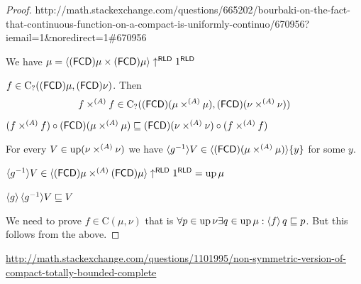 \begin{proof}

http://math.stackexchange.com/questions/665202/bourbaki-on-the-fact-that-continuous-function-on-a-compact-is-uniformly-continuo/670956?iemail=1\&noredirect=1\#670956

We have $\mu= \langle (\mathsf{FCD}) \mu \times
(\mathsf{FCD}) \mu \rangle \uparrow^{\mathsf{RLD}} 1^{\mathsf{RLD}}$

$f \in \mathrm{C}_? ((\mathsf{FCD}) \mu, (\mathsf{FCD})
\nu)$. Then
\[ f \times^{(A)} f \in \mathrm{C}_? ((\mathsf{FCD}) (\mu \times^{(A)}
   \mu) , (\mathsf{FCD}) (\nu \times^{(A)} \nu)) \]
$(f \times^{(A)} f) \circ (\mathsf{FCD}) (\mu \times^{(A)} \mu)
\sqsubseteq (\mathsf{FCD}) (\nu \times^{(A)} \nu) \circ (f \times^{(A)} f)$

For every $V \in \operatorname{up} (\nu \times^{(A)} \nu)$ we have $\langle g^{- 1} \rangle
V \in \langle (\mathsf{FCD}) (\mu \times^{(A)} \mu) \rangle
\{ y \}$ for some $y$.

$\langle g^{- 1} \rangle V \in \langle (\mathsf{FCD}) \mu \times^{(A)}
(\mathsf{FCD}) \mu \rangle \uparrow^{\mathsf{RLD}} 1^{\mathsf{RLD}}
= \operatorname{up} \mu$

$\left\langle g\right\rangle \langle g^{- 1} \rangle V \sqsubseteq V$

We need to prove $f \in \mathrm{C} (\mu, \nu)$ that is $\forall p \in
\operatorname{up} \nu \exists q \in \operatorname{up} \mu: \left\langle f\right\rangle q
\sqsubseteq p$. But this follows from the above.
\end{proof}


\url{http://math.stackexchange.com/questions/1101995/non-symmetric-version-of-compact-totally-bounded-complete}
